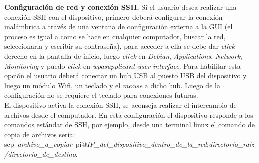 \documentclass[11pt,lettersize]{article} %
\begin{document}
\textbf{Configuración de red y conexión SSH.} \label{S-ssh}
Si el usuario desea realizar una conexión SSH con el dispositivo, primero deberá configurar la conexión inalámbrica a través de una ventana de configuración externa a la GUI (el proceso es igual a como se hace en cualquier computador, buscar la red, seleccionarla y escribir su contraseña), para acceder a ella se debe dar \textit{click} derecho en la pantalla de inicio, luego \textit{click} en \textit{Debian}, \textit{Applications}, \textit{Network}, \textit{Monitoring} y puedo \textit{click} en \textit{wpasupplicant user interface}. Para habilitar esta opción el usuario deberá conectar un hub USB al puesto USB del dispositivo y luego un módulo Wifi, un teclado y el \textit{mouse} a dicho hub. Luego de la configuración no se requiere el teclado para conexiones futuras. \\

El dispositivo activa la conexión SSH, se aconseja realizar el intercambio de archivos desde el computador. En esta configuración el dispositivo responde a los comandos estándar de SSH, por ejemplo, desde una terminal linux el comando de copia de archivos sería: \mbox{{\footnotesize scp \textit{archivo\_a\_copiar} pi@\textit{IP\_del\_dispositivo\_dentro\_de\_la\_red}:\textit{directorio\_raiz/directorio\_de\_destino}}}.




\end{document}
